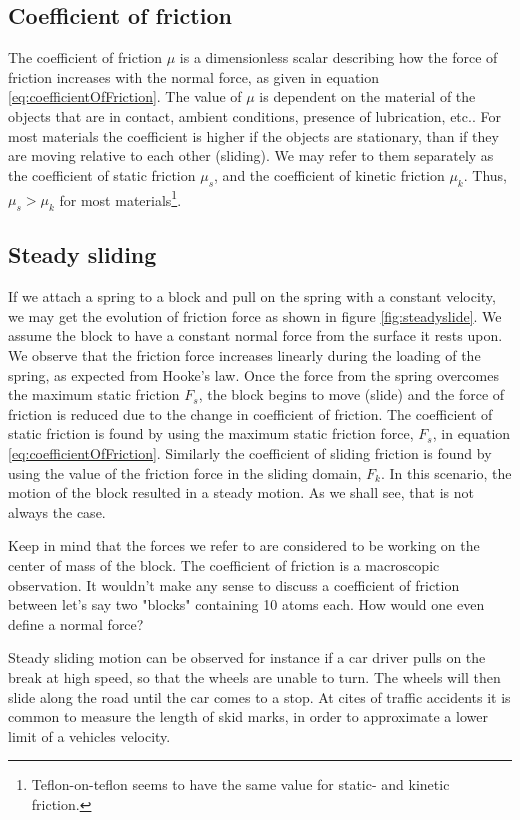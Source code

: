 \documentclass[twoside,english]{uiofysmaster}
\begin{document}
\subsection{Coefficient of friction}\label{sec:coefficientOfFriction}
The coefficient of friction $\mu$  is a dimensionless scalar describing how the force of friction increases with the normal force, as given in equation \eqref{eq:coefficientOfFriction}.
The value of $\mu$ is dependent on the material of the objects that are in contact, ambient conditions, presence of lubrication, etc.. 
For most materials the coefficient is higher if the objects are stationary, than if they are moving relative to each other (sliding).
We may refer to them separately as the coefficient of static friction $\mu_s$, and the coefficient of kinetic friction $\mu_k$.
Thus, $\mu_s>\mu_ k$ for most materials\footnote{Teflon-on-teflon seems to have the same value for static- and kinetic friction.}.

\subsection{Steady sliding}
If we attach a spring to a block and pull on the spring with a constant velocity, we may get the evolution of friction force as shown in figure \ref{fig:steadyslide}.
We assume the block to have a constant normal force from the surface it rests upon. 
We observe that the friction force increases linearly during the loading of the spring, as expected from Hooke's law. 
Once the force from the spring overcomes the maximum static friction $F_s$, the block begins to move (slide) and the force of friction is reduced due to the change in coefficient of friction. 
The coefficient of static friction is found by using the maximum static friction force, $F_s$, in equation \eqref{eq:coefficientOfFriction}. 
Similarly the coefficient of sliding friction is found by using the value of the friction force in the sliding domain, $F_k$.
In this scenario, the motion of the block resulted in a steady motion. 
As we shall see, that is not always the case.

Keep in mind that the forces we refer to are considered to be working on the center of mass of the block. 
The coefficient of friction is a macroscopic observation.
It wouldn't make any sense to discuss a coefficient of friction between let's say two "blocks" containing 10 atoms each.
How would one even define a normal force? 

Steady sliding motion can be observed for instance if a car driver pulls on the break at high speed, so that the wheels are unable to turn.
The wheels will then slide along the road until the car comes to a stop. 
At cites of traffic accidents it is common to measure the length of skid marks, in order to approximate a lower limit of a vehicles velocity. 
\raggedbottom
\end{document}
